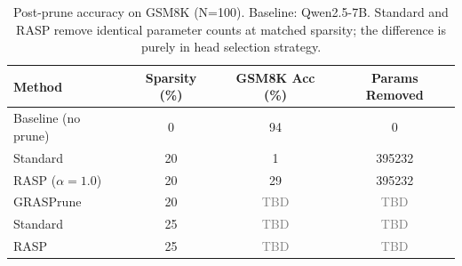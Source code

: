 \begin{table}[t]
\centering
\caption{Post-prune accuracy on GSM8K (N=100). Baseline: Qwen2.5-7B. Standard and RASP remove identical parameter counts at matched sparsity; the difference is purely in head selection strategy.}
\label{tab:postprune}
\begin{tabular}{l S[table-format=2.0] S[table-format=2.0] S[table-format=6.0]}
\toprule
{Method} & {Sparsity (\%)} & {GSM8K Acc (\%)} & {Params Removed} \\
\midrule
Baseline (no prune) & 0  & 94 & 0 \\
Standard            & 20 & 1  & 395232 \\
RASP ($\alpha{=}1.0$) & 20 & 29 & 395232 \\
GRASPrune           & 20 & \textcolor{gray}{TBD} & \textcolor{gray}{TBD} \\
\midrule
Standard            & 25 & \textcolor{gray}{TBD} & \textcolor{gray}{TBD} \\
RASP                & 25 & \textcolor{gray}{TBD} & \textcolor{gray}{TBD} \\
\bottomrule
\end{tabular}
\end{table}
